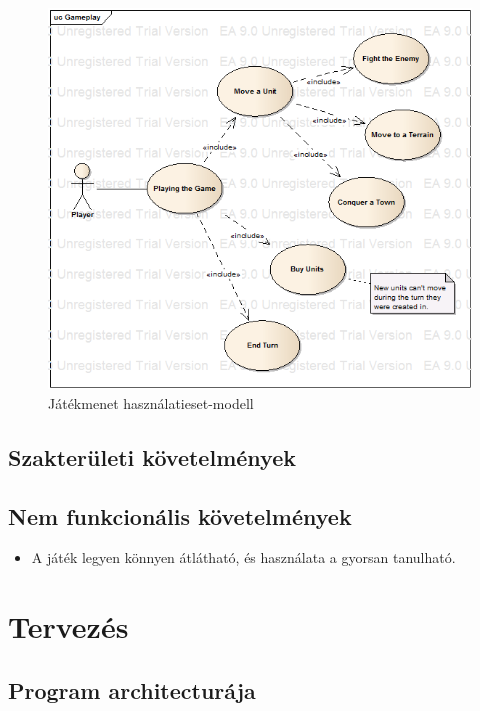 \documentclass[a4paper,12pt]{report}
\begin{document}
\begin{figure}[hbtp]
\centering
\includegraphics[width=1\textwidth]{GamePlayUseCase.png}
\caption{Játékmenet használatieset-modell}
\label{fig:hmm}
\end{figure}

\section{Szakterületi követelmények}

\section{Nem funkcionális követelmények}
\begin{itemize}
\item A játék legyen könnyen átlátható, és használata a gyorsan tanulható.
\end{itemize} 

\chapter{Tervezés}

\section{Program architecturája}
\end{document}
